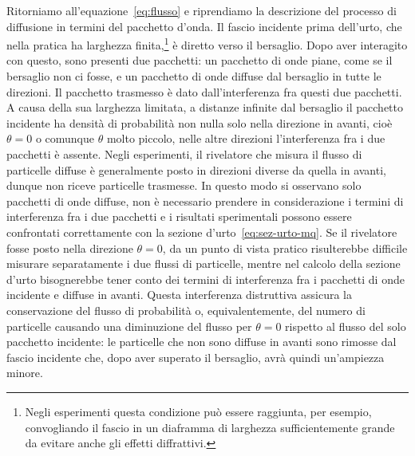 \documentclass[a4paper,fleqn,twoside,12pt]{article}
\begin{document}
Ritorniamo all'equazione~\eqref{eq:flusso} e riprendiamo la descrizione del
processo di diffusione in termini del pacchetto d'onda.  Il fascio incidente
prima dell'urto, che nella pratica ha larghezza
finita,\footnote{Negli esperimenti questa condizione può essere raggiunta, per
  esempio, convogliando il fascio in un diaframma di larghezza sufficientemente
  grande da evitare anche gli effetti diffrattivi.}
è diretto verso il bersaglio.  Dopo aver interagito con questo, sono presenti
due pacchetti: un pacchetto di onde piane, come se il bersaglio non ci fosse, e
un pacchetto di onde diffuse dal bersaglio in tutte le direzioni.  Il pacchetto
trasmesso è dato dall'interferenza fra questi due pacchetti.  A causa della sua
larghezza limitata, a distanze infinite dal bersaglio il pacchetto incidente ha
densità di probabilità non nulla solo nella direzione in avanti, cioè
$\theta = 0$ o comunque $\theta$ molto piccolo, nelle altre direzioni
l'interferenza fra i due pacchetti è assente.  Negli esperimenti, il rivelatore
che misura il flusso di particelle diffuse è generalmente posto in direzioni
diverse da quella in avanti, dunque non riceve particelle trasmesse.  In questo
modo si osservano solo pacchetti di onde diffuse, non è necessario prendere in
considerazione i termini di interferenza fra i due pacchetti e i risultati
sperimentali possono essere confrontati correttamente con la sezione
d'urto~\eqref{eq:sez-urto-mq}.  Se il rivelatore fosse posto nella direzione
$\theta = 0$, da un punto di vista pratico risulterebbe difficile misurare
separatamente i due flussi di particelle, mentre nel calcolo della sezione
d'urto bisognerebbe tener conto dei termini di interferenza fra i pacchetti di
onde incidente e diffuse in avanti.  Questa interferenza distruttiva assicura la
conservazione del flusso di probabilità o, equivalentemente, del numero di
particelle causando una diminuzione del flusso per $\theta = 0$ rispetto al
flusso del solo pacchetto incidente: le particelle che non sono diffuse in
avanti sono rimosse dal fascio incidente che, dopo aver superato il bersaglio,
avrà quindi un'ampiezza minore.

\end{document}
